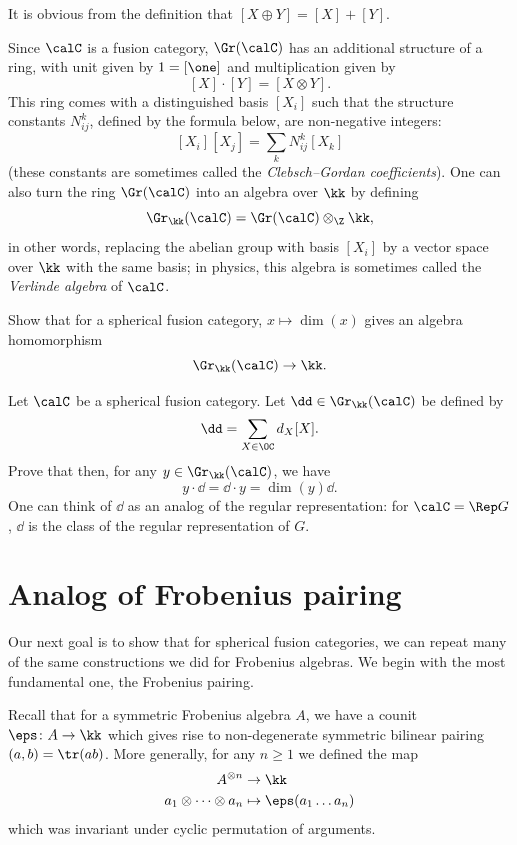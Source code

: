 It is obvious from the definition that $[X\oplus Y]=[X]+[Y]$.

Since $\calC$ is a fusion category, $\Gr(\calC)$ has an additional structure of
a ring, with unit given by $1=[\one]$ and multiplication given by
$$
  [X]\cdot [Y]=[X\otimes Y].
$$
This ring comes with a distinguished basis $[X_i]$ such
that the structure constants $N_{ij}^k$, defined by the formula below, are
non-negative integers:
$$
  [X_i][X_j]=\sum_k N_{ij}^k [X_k]
$$
(these constants are sometimes called the \emph{Clebsch--Gordan coefficients}).
One can also turn the ring $\Gr(\calC)$ into an algebra over $\kk$ by defining
$$
  \Gr_\kk(\calC)=\Gr(\calC)\otimes_\Z \kk,
$$
in other words, replacing the abelian group with basis $[X_i]$ by a vector space
over $\kk$ with the same basis; in physics, this algebra is sometimes called the
\emph{Verlinde algebra} of $\calC$.

\begin{exercise}\label{ec:dim-hom}
  Show that for a spherical fusion category,
  $x\mapsto \dim (x)$ gives an algebra homomorphism
  $$
    \Gr_\kk(\calC)\to \kk.
  $$
\end{exercise}

\begin{exercise}\label{ec:virtual-regular}
  Let $\calC$ be a spherical fusion category. Let
  $\dd \in \Gr_\kk(\calC)$ be defined by
  \begin{equation}\label{d:dd}
    \dd = \sum_{X\in \OC}d_X [X].
  \end{equation}
  Prove that then, for any $y \in \Gr_\kk(\calC)$, we have
  $$
    y \cdot \dd = \dd\cdot y = \dim(y) \dd.
  $$
  One can think of $\dd$ as an analog of the
  regular representation: for $\calC=\Rep G$, $\dd$ is the class of the
  regular representation of $G$.
\end{exercise}



\section{Analog of Frobenius pairing}\label{s:cat-pairing}
Our next goal is to show that for spherical fusion categories, we can repeat
many of the same constructions we did for Frobenius algebras. We begin with the
most fundamental one, the Frobenius pairing.

Recall that for a symmetric Frobenius algebra $A$, we have a counit $\eps\colon
A\to \kk$ which gives rise to non-degenerate symmetric bilinear pairing
$(a,b)=\tr(ab)$. More generally, for any $n\ge 1$ we defined the map
\begin{align*} A^{\otimes n}&\to \kk\\ a_1\otimes\dots\otimes a_n &\mapsto \eps
(a_1\dots a_n) \end{align*} which was invariant under cyclic permutation of
arguments.

